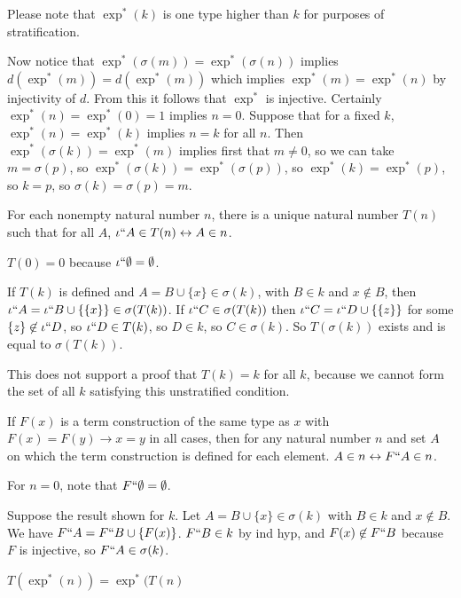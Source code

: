 \documentclass[12pt]{article}
\begin{document}
\begin{description}
Please note that $\exp^*(k)$ is one type higher than $k$ for purposes of stratification.

Now notice that $\exp^*(\sigma(m))=\exp^*(\sigma(n))$ implies $d(\exp^*(m))=d(\exp^*(m))$ which implies $\exp^*(m)=\exp^*(n)$ by injectivity of $d$.  From this it follows that $\exp^*$ is injective.
Certainly $\exp^*(n)=\exp^*(0)=1$ implies $n=0$.  Suppose that for a fixed $k$, $\exp^*(n)=\exp^*(k)$ implies $n=k$ for all $n$.  Then $\exp^*(\sigma(k)) =\exp^*(m)$ implies first that $m \neq 0$, so we can take $m=\sigma(p)$, so $\exp^*(\sigma(k))=\exp^*(\sigma(p))$, so $\exp^*(k)=\exp^*(p)$, so $k=p$, so $\sigma(k)=\sigma(p)=m$.

\item[Type raising:]  For each nonempty natural number $n$, there is a unique natural number $T(n)$ such that for all $A$, $\iota``A \in T(n)\leftrightarrow A \in n$.

\item[Proof:]  $T(0)=0$ because $\iota``\emptyset = \emptyset$.

If $T(k)$ is defined and $A = B \cup \{x\} \in \sigma(k)$, with $B \in k$ and $x \not\in B$, then $\iota``A = \iota``B \cup \{\{x\}\} \in \sigma(T(k))$.  
If $\iota``C \in \sigma(T(k))$ then $\iota``C = \iota``D \cup \{\{z\}\}$ for some $\{z\} \not\in \iota``D$, so $\iota``D \in T(k)$, so $D \in k$, so $C \in \sigma(k)$.
So $T(\sigma(k))$ exists and is equal to $\sigma(T(k))$.

This does not support a proof that $T(k)=k$ for all $k$, because we cannot form the set of all $k$ satisfying this unstratified condition.

\item[Bijection lemma:]  If $F(x)$ is a term construction of the same type as $x$ with $F(x)=F(y) \rightarrow x=y$ in all cases, then for any natural number $n$ and set $A$ on which the term construction
is defined for each element. $A \in n \leftrightarrow F``A \in n$.

\item[Proof:]  For $n=0$, note that $F``\emptyset = \emptyset$.

Suppose the result shown for $k$.  Let $A = B \cup \{x\} \in \sigma(k)$ with $B \in k$ and $x \not\in B$.  We have $F``A = F``B \cup \{F(x)\}$.  $F``B \in k$ by ind hyp, and $F(x) \not\in F``B$ because
$F$ is injective, so $F``A \in \sigma(k)$.

\item[Lemma:]  $T(\exp^*(n)) = \exp^*(T(n)$


\end{description}
\end{document}
